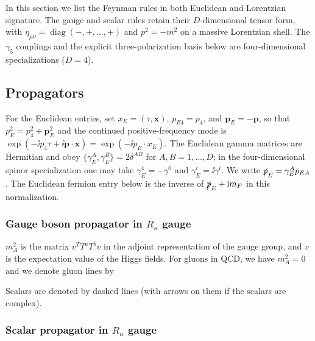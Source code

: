 


In this section we list the Feynman rules in both Euclidean and Lorentzian
signature. The gauge and scalar rules retain their $D$-dimensional tensor
form, with $\eta_{\mu\nu}=\operatorname{diag}(-,+,\ldots,+)$ and
$p^2=-m^2$ on a massive Lorentzian shell. The $\gamma_5$ couplings and the
explicit three-polarization basis below are four-dimensional specializations
($D=4$).

\subsection{Propagators}

For the Euclidean entries, set $x_E=(\tau,\mathbf x)$,
$p_{E4}=p_4$, and $\mathbf p_E=-\mathbf p$, so that
$p_E^2=p_4^2+\mathbf p_E^2$ and the continued positive-frequency mode is
$\exp(-\ii p_4\tau+\ii\mathbf p\mathbin{\cdot}\mathbf x)
=\exp(-\ii p_E\mathbin{\cdot}x_E)$.  The Euclidean gamma matrices are
Hermitian and obey $\{\gamma_E^A,\gamma_E^B\}=2\delta^{AB}$ for
$A,B=1,\ldots,D$; in the four-dimensional spinor specialization one may take
$\gamma_E^4=-\gamma^0$ and $\gamma_E^i=\ii\gamma^i$.  We write
$\slashed p_E=\gamma_E^A p_{EA}$.  The Euclidean fermion entry below is the
inverse of $\slashed p_E+\mathrm{i} m_F$ in this normalization.

\BanksDGaugePropagator

\subsubsection{Gauge boson propagator in $R_\kappa$ gauge}

\(m_A^2\) is the matrix \(v^T T^aT^b v\) in the adjoint representation of the
gauge group, and \(v\) is the expectation value of the Higgs fields. For gluons
in QCD, we have \(m_A^2=0\) and we denote gluon lines by

\BanksDGluonLine

Scalars are denoted by dashed lines (with arrows on them if the scalars are
complex).

\BanksDScalarPropagator

\subsubsection{Scalar propagator in $R_\kappa$ gauge}

